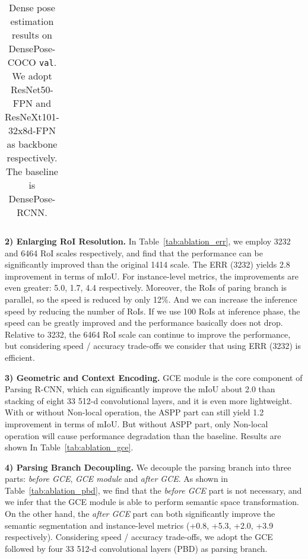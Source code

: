 \documentclass[10pt,twocolumn,letterpaper]{article}
\begin{document}
\begin{table*}[!t]
{\begin{tabular}{c c c c c c | c c c | c c}
  \end{tabular}
 }
  \caption{Dense pose estimation results on DensePose-COCO \texttt{val}. We adopt ResNet50-FPN and ResNeXt101-32x8d-FPN as backbone respectively. The baseline is DensePose-RCNN.} 
  \label{tab:densepose_results}
\end{table*}



\vspace{3pt}
\noindent\textbf{2) Enlarging RoI Resolution.}  In Table~\ref{tab:ablation_err}, we employ 3232 and 6464 RoI scales respectively, and find that the performance can be significantly improved than the original 1414 scale. The ERR (3232) yields 2.8 improvement in terms of mIoU. For instance-level metrics, the improvements are even greater: 5.0, 1.7, 4.4 respectively. Moreover, the RoIs of paring branch is parallel, so the speed is reduced by only 12\%. And we can increase the inference speed by reducing the number of RoIs. If we use 100 RoIs at inference phase, the speed can be greatly improved and the performance basically does not drop. Relative to 3232, the 6464 RoI scale can continue to improve the performance, but considering speed / accuracy trade-offs we consider that using ERR (3232) is efficient.

\vspace{3pt}
\noindent\textbf{3) Geometric and Context Encoding.} GCE module is the core component of Parsing R-CNN, which can significantly improve the mIoU about 2.0 than stacking of eight 33 512-d convolutional layers, and it is even more lightweight. With or without Non-local operation, the ASPP part can still yield 1.2 improvement in terms of mIoU. But without ASPP part, only Non-local operation will cause performance degradation than the baseline. Results are shown In Table~\ref{tab:ablation_gce}.

\vspace{3pt}
\noindent\textbf{4) Parsing Branch Decoupling.} We decouple the parsing branch into three parts: \emph{before GCE},  \emph{GCE module} and  \emph{after GCE}. As shown in Table~\ref{tab:ablation_pbd}, we find that the \emph{before GCE} part is not necessary, and we infer that the GCE module is able to perform semantic space transformation. On the other hand, the \emph{after GCE} part can both significantly improve the semantic segmentation and instance-level metrics (+0.8, +5.3, +2.0, +3.9 respectively). Considering speed / accuracy trade-offs, we adopt the GCE followed by four 33 512-d convolutional layers (PBD) as parsing branch.
\end{document}
